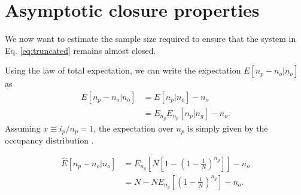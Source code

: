 \documentclass[review]{elsarticle}
\newcommand{\dslash}{/\!\!/}
\newcommand{\sgcomment}[1]{{\color{red}{SG: #1}}}
\begin{document}
\section{Asymptotic closure properties}
\label{sec:asympt}

We now want to estimate the sample size required to ensure that the system in Eq.
\eqref{eq:truncated} remains almost closed. 







Using the law of total expectation, we can write the expectation $E[n_p-n_o | n_o]$ as 
\begin{equation*}
  \begin{aligned}
    \label{eq:lineages-approx}
    E[n_p-n_o | n_o] &=        E[n_p | n_o]       - n_o \\
                     &=E_{n_g} E_{n_p}[n_p | n_g] - n_o.
  \end{aligned}
\end{equation*}
Assuming $x\equiv i_p/n_p=1$, the expectation over $n_p$ is simply given by the occupancy distribution \cite{Wakeley2009}.

\begin{equation*}
  \begin{aligned}
    \label{eq:lineages-derive}
    \hat{E}[n_p -n_o | n_o]
    & =   E_{n_g}\left[N\left[1-\left(1 - \frac{1}{N} \right)^{n_g} \right]\right]- n_o\\
    & =   N-N  E_{n_g}\left[\left(1 - \frac{1}{N} \right)^{n_g} \right] -n_o. 
  \end{aligned}
\end{equation*}
\end{document}
